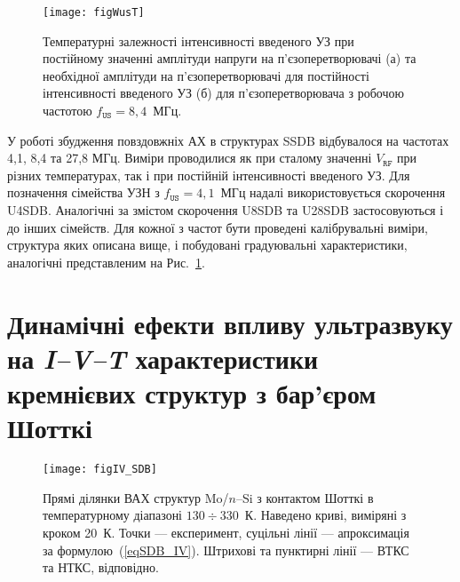 \begin{figure}
\center
\texttt{[image: figWusT]}%
\caption{\label{figWusT}
Температурні залежності
інтенсивності введеного УЗ при постійному значенні амплітуди напруги на п'єзоперетворювачі (а)
та необхідної амплітуди на п'єзоперетворювачі для постійності інтенсивності введеного УЗ (б)
для п'єзоперетворювача з робочою частотою $f_\mathtt{US}=8,4$~МГц.
}
\end{figure}

У роботі збудження повздовжніх АХ в структурах SSDB відбувалося на частотах 4,1, 8,4 та 27,8 МГц.
Виміри проводилися як при сталому значенні $V_\mathtt{RF}$ при різних температурах, так і при постійній інтенсивності введеного УЗ.
Для позначення сімейства УЗН з $f_\mathtt{US}=4,1$~МГц надалі використовується скорочення U4SDB.
Аналогічні за змістом скорочення U8SDB та U28SDB застосовуються і до інших сімейств.
Для кожної з частот бути проведені калібрувальні виміри, структура яких описана вище, і побудовані градуювальні характеристики,
аналогічні представленим на Рис.~\ref{figWusT}.





\section{Динамічні ефекти впливу ультразвуку на \emph{I--V--T} характеристики кремнієвих структур з бар'єром Шотткі\label{SSDB:Forw}}

\begin{figure}[b]
\center
\texttt{[image: figIV\_SDB]}
\caption{\label{figIV_SDB}
Прямі  ділянки ВАХ структур Mo/$n$--Si з контактом Шотткі в температурному діапазоні $130\div330$~К.
Наведено криві, виміряні з кроком 20~К.
Точки --- експеримент,
суцільні лінії --- апроксимація за формулою~(\ref{eqSDB_IV}).
Штрихові та пунктирні лінії --- ВТКС та НТКС, відповідно.
}%
\end{figure}


